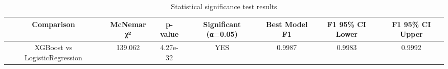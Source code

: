 \begin{table}
\caption{Statistical significance test results}
\label{tab:significance}
\begin{tabular}{ccccccc}
\midrule
Comparison & McNemar χ² & p-value & Significant (α=0.05) & Best Model F1 & F1 95\% CI Lower & F1 95\% CI Upper \\
\midrule
XGBoost vs LogisticRegression & 139.062 & 4.27e-32 & YES & 0.9987 & 0.9983 & 0.9992 \\
\bottomrule
\end{tabular}
\end{table}
